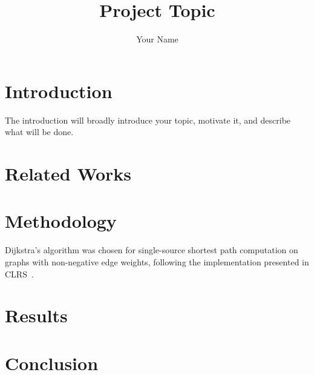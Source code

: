 \documentclass[12pt]{article}
\title{\textbf{Project Topic}}
\author{Your Name}
\begin{document}
\maketitle

\section{Introduction}
The introduction will broadly introduce your topic, motivate it, and describe what will be done.

\section{Related Works}

\section{Methodology}
Dijkstra's algorithm was chosen for single-source shortest path computation on graphs with non-negative edge weights, following the implementation presented in CLRS~\cite{clrsAlgorithms}.

\section{Results}

\section{Conclusion}



\end{document}
